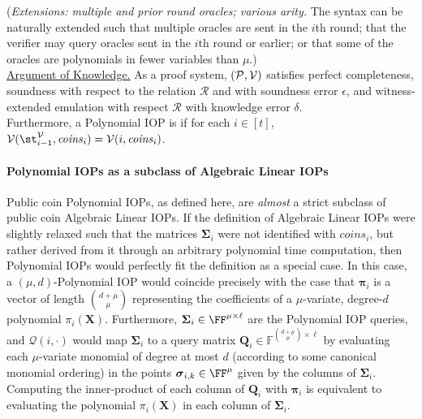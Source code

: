 \begin{definition}
(\emph{Extensions: multiple and prior round oracles; various arity.} The syntax can be naturally extended such that multiple oracles are sent in the $i$th round; that the verifier may query oracles sent in the $i$th round or earlier; or that some of the oracles are polynomials in fewer variables than $\mu$.) \\ 

\noindent \underline{Argument of Knowledge.} As a proof system, $(\mathcal{P}, \mathcal{V})$ satisfies perfect completeness, soundness with respect to the relation $\mathcal{R}$ and with soundness error $\epsilon$, and witness-extended emulation with respect $\mathcal{R}$ with knowledge error $\delta$. \\

Furthermore, a Polynomial IOP is  if for each $i \in [t]$, $\mathcal{V}(\st^\verifier_{i-1}, \mathit{coins}_i) = \mathcal{V}(i, \mathit{coins}_i)$. 
\end{definition}

\paragraph{Polynomial IOPs as a subclass of Algebraic Linear IOPs}

Public coin Polynomial IOPs, as defined here, are \emph{almost} a strict subclass of public coin Algebraic Linear IOPs. If the definition of Algebraic Linear IOPs were slightly relaxed such that the matrices $\boldsymbol{\Sigma}_i$ were not identified with $\mathit{coins}_i$, but rather derived from it through an arbitrary polynomial time computation, then Polynomial IOPs would perfectly fit the definition as a special case. In this case, a $(\mu, d)$-Polynomial IOP would coincide precisely with the case that $\boldsymbol{\pi}_i$ is a vector of length ${d+\mu \choose \mu}$ representing the coefficients of a $\mu$-variate, degree-$d$ polynomial $\pi_i(\mathbf{X})$. Furthermore, $\boldsymbol{\Sigma}_i \in \FF^{\mu \times \ell}$ are the Polynomial IOP queries, and $\mathcal{Q}(i, \cdot)$ would map $\boldsymbol{\Sigma}_i$ to a query matrix $\mathbf{Q}_i \in \mathbb{F}^{{d+\mu \choose \mu} \times \ell}$ by evaluating each $\mu$-variate monomial of degree at most $d$ (according to some canonical monomial ordering) in the points $\boldsymbol{\sigma}_{i,k} \in \FF^\mu$ given by the columns of $\boldsymbol{\Sigma}_i$. Computing the inner-product of each column of $\mathbf{Q}_i$ with $\boldsymbol{\pi}_i$ is equivalent to evaluating the polynomial $\pi_i(\mathbf{X})$ in each column of $\boldsymbol{\Sigma}_i$.

